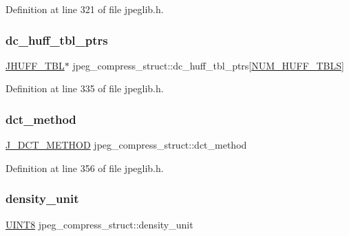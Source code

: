 Definition at line 321 of file jpeglib.\+h.

\mbox{\label{structjpeg__compress__struct_a6a69e90a68e1f7f46774d83ba3737a4e}} 
\subsubsection{\texorpdfstring{dc\_huff\_tbl\_ptrs}{dc\_huff\_tbl\_ptrs}}
{\footnotesize\ttfamily \mbox{\hyperlink{structJHUFF__TBL}{J\+H\+U\+F\+F\+\_\+\+T\+BL}}$\ast$ jpeg\+\_\+compress\+\_\+struct\+::dc\+\_\+huff\+\_\+tbl\+\_\+ptrs\mbox{[}\mbox{\hyperlink{jpeglib_8h_a6b12985705944e0623b671f29dc5722e}{N\+U\+M\+\_\+\+H\+U\+F\+F\+\_\+\+T\+B\+LS}}\mbox{]}}



Definition at line 335 of file jpeglib.\+h.

\mbox{\label{structjpeg__compress__struct_ab782f698c650e8ec5f9b47043691d3c1}} 
\subsubsection{\texorpdfstring{dct\_method}{dct\_method}}
{\footnotesize\ttfamily \mbox{\hyperlink{jpeglib_8h_ae4245c819e9217a321fb23f1a106d563}{J\+\_\+\+D\+C\+T\+\_\+\+M\+E\+T\+H\+OD}} jpeg\+\_\+compress\+\_\+struct\+::dct\+\_\+method}



Definition at line 356 of file jpeglib.\+h.

\mbox{\label{structjpeg__compress__struct_a8f3a056ed558bf7be4ff52999416a525}} 
\subsubsection{\texorpdfstring{density\_unit}{density\_unit}}
{\footnotesize\ttfamily \mbox{\hyperlink{jmorecfg_8h_adfb9a8ea1dd59f151065f763e1e9acd6}{U\+I\+N\+T8}} jpeg\+\_\+compress\+\_\+struct\+::density\+\_\+unit}



